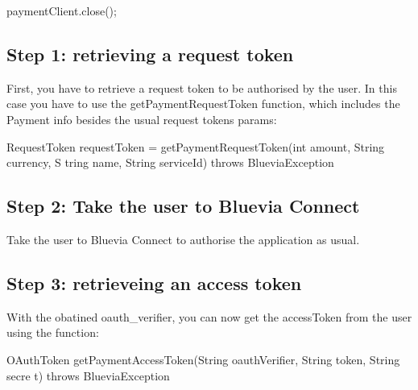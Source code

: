 \begin{DoxyCode}
paymentClient.close();
\end{DoxyCode}
\hypertarget{blv_payment_guide_retrieving_payment_request_token_sec}{}\subsection{Step 1: retrieving a request token}\label{blv_payment_guide_retrieving_payment_request_token_sec}
First, you have to retrieve a request token to be authorised by the user. In this case you have to use the getPaymentRequestToken function, which includes the Payment info besides the usual request tokens params:


\begin{DoxyCode}
RequestToken requestToken = getPaymentRequestToken(int amount, String currency, S
      tring name, String serviceId) throws BlueviaException
\end{DoxyCode}
\hypertarget{blv_payment_guide_retrieving_payment_verification_sec}{}\subsection{Step 2: Take the user to Bluevia Connect}\label{blv_payment_guide_retrieving_payment_verification_sec}
Take the user to Bluevia Connect to authorise the application as usual.\hypertarget{blv_payment_guide_retrieving_payment_access_token_sec}{}\subsection{Step 3: retrieveing an access token}\label{blv_payment_guide_retrieving_payment_access_token_sec}
With the obatined oauth\_\-verifier, you can now get the accessToken from the user using the function:


\begin{DoxyCode}
OAuthToken getPaymentAccessToken(String oauthVerifier, String token, String secre
      t) throws BlueviaException
\end{DoxyCode}


